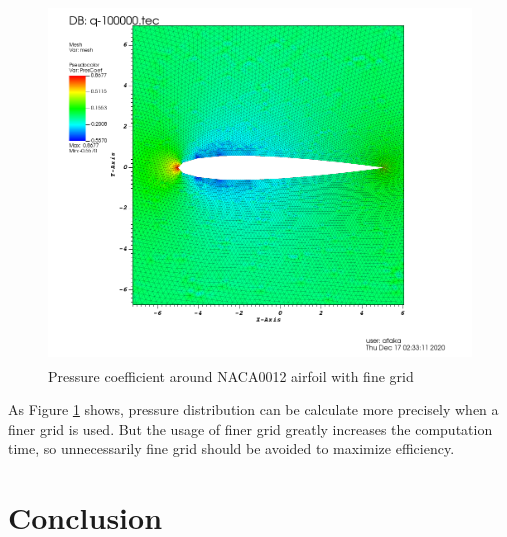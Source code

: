 \documentclass[letterpaper,12pt]{article}
\begin{document}
\vspace{2cm}

\begin{figure} [!h]
	\centering
	\includegraphics[height = 9.5cm]{graph/fine/fine_pressure0000.png}
	\caption{Pressure coefficient around NACA0012 airfoil with fine grid}
    \label{fig:airfoilfinepressure}
\end{figure}

\vspace{2cm}

As Figure \ref{fig:airfoilfinepressure} shows, pressure distribution can be 
calculate more precisely when a finer grid is used. But the usage of finer grid
greatly increases the computation time, so unnecessarily fine grid should be avoided 
to maximize efficiency.


\section{Conclusion}
\end{document}
